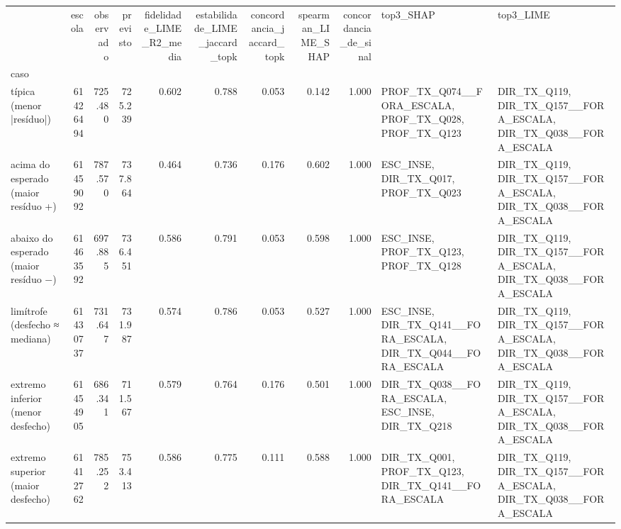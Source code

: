 \begin{tabular}{lrrrrrrrrll}
\toprule
 & escola & observado & previsto & fidelidade\_LIME\_R2\_media & estabilidade\_LIME\_jaccard\_topk & concordancia\_jaccard\_topk & spearman\_LIME\_SHAP & concordancia\_de\_sinal & top3\_SHAP & top3\_LIME \\
caso &  &  &  &  &  &  &  &  &  &  \\
\midrule
típica (menor |resíduo|) & 61426494 & 725.480 & 725.239 & 0.602 & 0.788 & 0.053 & 0.142 & 1.000 & PROF\_TX\_Q074\_\_FORA\_ESCALA, PROF\_TX\_Q028, PROF\_TX\_Q123 & DIR\_TX\_Q119, DIR\_TX\_Q157\_\_FORA\_ESCALA, DIR\_TX\_Q038\_\_FORA\_ESCALA \\
acima do esperado (maior resíduo +) & 61459092 & 787.570 & 737.864 & 0.464 & 0.736 & 0.176 & 0.602 & 1.000 & ESC\_INSE, DIR\_TX\_Q017, PROF\_TX\_Q023 & DIR\_TX\_Q119, DIR\_TX\_Q157\_\_FORA\_ESCALA, DIR\_TX\_Q038\_\_FORA\_ESCALA \\
abaixo do esperado (maior resíduo −) & 61463592 & 697.885 & 736.451 & 0.586 & 0.791 & 0.053 & 0.598 & 1.000 & ESC\_INSE, PROF\_TX\_Q123, PROF\_TX\_Q128 & DIR\_TX\_Q119, DIR\_TX\_Q157\_\_FORA\_ESCALA, DIR\_TX\_Q038\_\_FORA\_ESCALA \\
limítrofe (desfecho ≈ mediana) & 61430737 & 731.647 & 731.987 & 0.574 & 0.786 & 0.053 & 0.527 & 1.000 & ESC\_INSE, DIR\_TX\_Q141\_\_FORA\_ESCALA, DIR\_TX\_Q044\_\_FORA\_ESCALA & DIR\_TX\_Q119, DIR\_TX\_Q157\_\_FORA\_ESCALA, DIR\_TX\_Q038\_\_FORA\_ESCALA \\
extremo inferior (menor desfecho) & 61454905 & 686.341 & 711.567 & 0.579 & 0.764 & 0.176 & 0.501 & 1.000 & DIR\_TX\_Q038\_\_FORA\_ESCALA, ESC\_INSE, DIR\_TX\_Q218 & DIR\_TX\_Q119, DIR\_TX\_Q157\_\_FORA\_ESCALA, DIR\_TX\_Q038\_\_FORA\_ESCALA \\
extremo superior (maior desfecho) & 61412762 & 785.252 & 753.413 & 0.586 & 0.775 & 0.111 & 0.588 & 1.000 & DIR\_TX\_Q001, PROF\_TX\_Q123, DIR\_TX\_Q141\_\_FORA\_ESCALA & DIR\_TX\_Q119, DIR\_TX\_Q157\_\_FORA\_ESCALA, DIR\_TX\_Q038\_\_FORA\_ESCALA \\
\bottomrule
\end{tabular}
